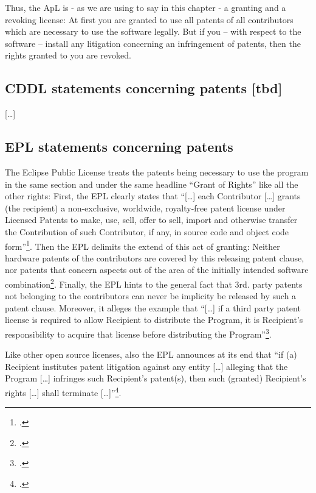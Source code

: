 Thus, the ApL is - as we are using to say in this chapter - a granting and a
revoking license: At first you are granted to use all patents of all
contributors which are necessary to use the software legally. But if you -- with
respect to the software -- install any litigation concerning an infringement of
patents, then the rights granted to you are revoked.

\subsection{CDDL statements concerning patents [tbd]}\label{subsec:CddlPatentClause}
[\ldots]

\subsection{EPL statements concerning patents}\label{subsec:EpLPatentClause}

The Eclipse Public License treats the patents being necessary to use the program
in the same section and under the same headline \enquote{Grant of Rights} like
all the other rights: First, the EPL clearly states that \enquote{[\ldots] each
Contributor [\ldots] grants (the recipient) a non-exclusive, worldwide,
royalty-free patent license under Licensed Patents to make, use, sell, offer to
sell, import and otherwise transfer the Contribution of such Contributor, if
any, in source code and object code form}\footcite[cf.][\nopage wp
§2.b]{Epl10OsiLicense2005a}. Then the EPL delimits the extend of this act of
granting: Neither hardware patents of the contributors are covered by this
releasing patent clause, nor patents that concern aspects out of the area of the
initially intended software combination\footcite[cf.][\nopage wp
§2.b]{Epl10OsiLicense2005a}. Finally, the EPL hints to the general fact that
3rd. party patents not belonging to the contributors can never be implicity be
released by such a patent clause. Moreover, it alleges the example that
\enquote{[\ldots] if a third party patent license is required to allow Recipient
to distribute the Program, it is Recipient's responsibility to acquire that
license before distributing the Program}\footcite[cf.][\nopage wp
§2.c]{Epl10OsiLicense2005a}.

Like other open source licenses, also the EPL announces at its end that
\enquote{if (a) Recipient institutes patent litigation against any entity
[\ldots] alleging that the Program [\ldots] infringes such Recipient's
patent(s), then such (granted) Recipient's rights [\ldots] shall terminate
[\ldots]}\footcite[cf.][\nopage wp §7]{Epl10OsiLicense2005a}.

